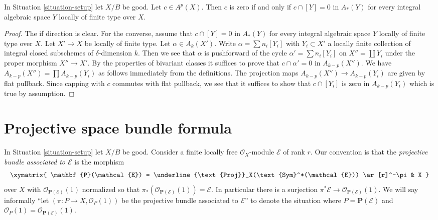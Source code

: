 \begin{lemma}
\label{lemma-bivariant-zero}
In Situation \ref{situation-setup} let $X/B$ be good. Let $c \in A^p(X)$.
Then $c$ is zero if and only if $c \cap [Y] = 0$ in $A_*(Y)$
for every integral algebraic space $Y$ locally of finite type over $X$.
\end{lemma}

\begin{proof}
The if direction is clear. For the converse, assume that $c \cap [Y] = 0$ in
$A_*(Y)$ for every integral algebraic space $Y$ locally of finite type over $X$.
Let $X' \to X$ be locally of finite type. Let $\alpha \in A_k(X')$.
Write $\alpha = \sum n_i [Y_i]$ with $Y_i \subset X'$ a locally finite
collection of integral closed subschemes of $\delta$-dimension $k$.
Then we see that $\alpha$ is pushforward of the cycle
$\alpha' = \sum n_i[Y_i]$ on $X'' = \coprod Y_i$ under the
proper morphism $X'' \to X'$. By the properties of bivariant
classes it suffices to prove that $c \cap \alpha' = 0$ in $A_{k - p}(X'')$.
We have $A_{k - p}(X'') = \prod A_{k - p}(Y_i)$ as follows immediately
from the definitions. The projection maps $A_{k - p}(X'') \to A_{k - p}(Y_i)$
are given by flat pullback. Since capping with $c$ commutes with
flat pullback, we see that it suffices to show that $c \cap [Y_i]$
is zero in $A_{k - p}(Y_i)$ which is true by assumption.
\end{proof}















\section{Projective space bundle formula}
\label{section-projective-space-bundle-formula}

\noindent
In Situation \ref{situation-setup} let $X/B$ be good.
Consider a finite locally free $\mathcal{O}_X$-module
$\mathcal{E}$ of rank $r$.
Our convention is that the {\it projective bundle associated to
$\mathcal{E}$} is the morphism
$$
\xymatrix{
\mathbf{P}(\mathcal{E}) =
\underline{\text{Proj}}_X(\text{Sym}^*(\mathcal{E}))
\ar[r]^-\pi
& X
}
$$
over $X$ with
$\mathcal{O}_{\mathbf{P}(\mathcal{E})}(1)$ normalized so that
$\pi_*(\mathcal{O}_{\mathbf{P}(\mathcal{E})}(1)) = \mathcal{E}$.
In particular there is a surjection
$\pi^*\mathcal{E} \to \mathcal{O}_{\mathbf{P}(\mathcal{E})}(1)$.
We will say informally ``let $(\pi : P \to X, \mathcal{O}_P(1))$
be the projective bundle associated to $\mathcal{E}$'' to denote
the situation where $P = \mathbf{P}(\mathcal{E})$ and
$\mathcal{O}_P(1) = \mathcal{O}_{\mathbf{P}(\mathcal{E})}(1)$.

